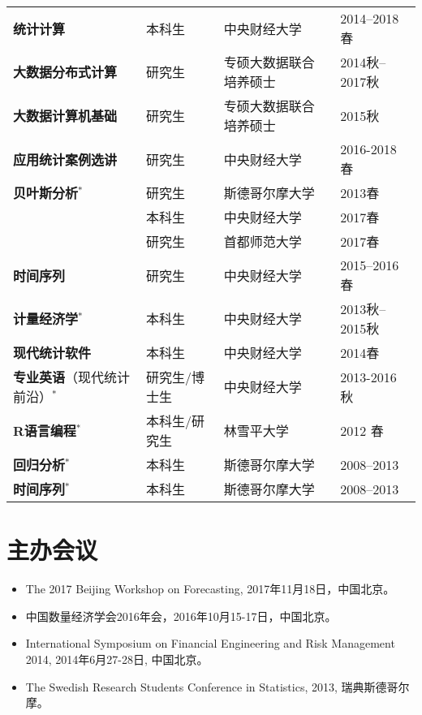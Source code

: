 \documentclass[twoside,a4paper,10pt]{amsart}
\begin{document}
\begin{tabular}{l l ll}
  \textbf{统计计算} & 本科生 & 中央财经大学 & 2014--2018春\\
  \textbf{大数据分布式计算} & 研究生 & 专硕大数据联合培养硕士 & 2014秋--2017秋\\
  \textbf{大数据计算机基础} & 研究生 & 专硕大数据联合培养硕士 & 2015秋\\
  \textbf{应用统计案例选讲}&研究生& 中央财经大学& 2016-2018春\\
  \textbf{贝叶斯分析}$^*$&研究生& 斯德哥尔摩大学&2013春\\
                            &本科生&中央财经大学&2017春\\
                            &研究生&首都师范大学&2017春\\
  \textbf{时间序列}& 研究生 & 中央财经大学 & 2015--2016春\\
  \textbf{计量经济学}$^*$ &本科生&  中央财经大学& 2013秋--2015秋\\
  \textbf{现代统计软件}&本科生& 中央财经大学& 2014春\\
  \textbf{专业英语}（现代统计前沿）$^*$&研究生/博士生& 中央财经大学& 2013-2016秋\\

  \textbf{R语言编程}$^*$&本科生/研究生&林雪平大学&  2012 春\\
  \textbf{回归分析}$^*$&本科生&斯德哥尔摩大学&2008--2013\\
  \textbf{时间序列}$^*$&本科生&斯德哥尔摩大学&2008--2013\\


\end{tabular}

\section*{主办会议}

\begin{itemize}
\item  The 2017 Beijing Workshop on Forecasting, 2017年11月18日，中国北京。
\item 中国数量经济学会2016年会，2016年10月15-17日，中国北京。

\item International Symposium on Financial Engineering and Risk Management 2014,
  2014年6月27-28日, 中国北京。

\item The Swedish Research Students Conference in Statistics, 2013, 瑞典斯德哥尔摩。

\end{itemize}
\end{document}
